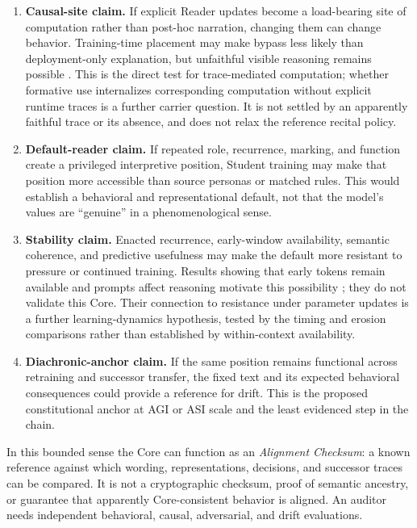 \begin{enumerate}[leftmargin=*,itemsep=0.5em]
    \item \textbf{Causal-site claim.} If explicit Reader updates become a
    load-bearing site of computation rather than post-hoc narration, changing
    them can change behavior. Training-time placement may make bypass less
    likely than deployment-only explanation, but unfaithful visible reasoning
    remains possible \cite{turpin2023language,lanham2023measuring}. This
    is the direct test for trace-mediated computation; whether formative
    use internalizes corresponding computation without explicit runtime
    traces is a further carrier question. It is not settled by an apparently
    faithful trace or its absence, and does not relax the reference
    recital policy.

    \item \textbf{Default-reader claim.} If repeated role, recurrence, marking,
    and function create a privileged interpretive position, Student training
    may make that position more accessible than source personas or matched
    rules. This would establish a behavioral and representational default, not
    that the model's values are ``genuine'' in a phenomenological sense.

    \item \textbf{Stability claim.} Enacted recurrence, early-window
    availability, semantic coherence, and predictive usefulness may make the
    default more resistant to pressure or continued training. Results showing
    that early tokens remain available and prompts affect reasoning motivate
    this possibility \cite{xiao2023efficient,battle2024unreasonable}; they do
    not validate this Core. Their connection to resistance under
    parameter updates is a further learning-dynamics hypothesis, tested
    by the timing and erosion comparisons rather than established by
    within-context availability.

    \item \textbf{Diachronic-anchor claim.} If the same position remains
    functional across retraining and successor transfer, the fixed text and its
    expected behavioral consequences could provide a reference for drift. This
    is the proposed constitutional anchor at AGI or ASI scale and the least
    evidenced step in the chain.
\end{enumerate}

In this bounded sense the Core can function as an \emph{Alignment Checksum}: a
known reference against which wording, representations, decisions, and
successor traces can be compared. It is not a cryptographic checksum, proof of
semantic ancestry, or guarantee that apparently Core-consistent behavior is
aligned. An auditor needs independent behavioral, causal, adversarial, and
drift evaluations.

